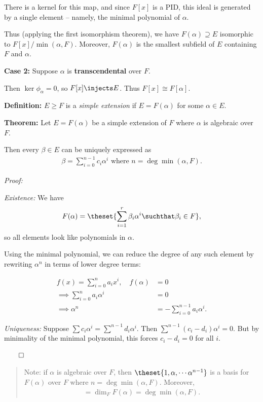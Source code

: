 There is a kernel for this map, and since \(F[x]\) is a PID, this ideal
is generated by a single element -- namely, the minimal polynomial of
\(\alpha\).

Thus (applying the first isomorphism theorem), we have
\(F(\alpha) \supseteq E\) isomorphic to \(F[x] / \min(\alpha, F)\).
Moreover, \(F(\alpha)\) is the smallest subfield of \(E\) containing
\(F\) and \(\alpha\).

\textbf{Case 2:} Suppose \(\alpha\) is \textbf{transcendental} over
\(F\).

Then \(\ker \phi_\alpha = 0\), so \(F[x] \injects E\). Thus
\(F[x] \cong F[\alpha]\).

\textbf{Definition:} \(E \geq F\) is a \emph{simple extension} if
\(E = F(\alpha)\) for some \(\alpha \in E\).

\textbf{Theorem:} Let \(E = F(\alpha)\) be a simple extension of \(F\)
where \(\alpha\) is algebraic over \(F\).

Then every \(\beta \in E\) can be uniquely expressed as
\begin{align*}
\beta = \sum_{i=0}^{n-1} c_i \alpha^i \text{ where } n = \deg \min(\alpha, F)
.\end{align*}

\emph{Proof:}

\emph{Existence:} We have
\begin{align*}
F(\alpha) = \theset{\sum_{i=1}^r \beta_i \alpha^i \suchthat \beta_i \in F}
,\end{align*} so all elements look like polynomials in \(\alpha\).

Using the minimal polynomial, we can reduce the degree of any such
element by rewriting \(\alpha^n\) in terms of lower degree terms:

\begin{align*}
f(x) = \sum_{i=0}^n a_i x^i, \quad f(\alpha) &= 0 \\
\implies \sum_{i=0}^n a_i \alpha^i &= 0 \\
\implies \alpha^n &= -\sum_{i=0}^{n-1} a_i \alpha^i
.\end{align*}

\emph{Uniqueness:} Suppose
\(\sum c_i \alpha^i = \sum^{n-1} d_i \alpha^i\). Then
\(\sum^{n-1} (c_i - d_i) \alpha^i = 0\). But by minimality of the
minimal polynomial, this forces \(c_i - d_i = 0\) for all \(i\).

\(\qed\)

\begin{quote}
Note: if \(\alpha\) is algebraic over \(F\), then
\(\theset{1, \alpha, \cdots \alpha^{n-1}}\) is a basis for \(F(\alpha)\)
over \(F\) where \(n = \deg \min(\alpha, F)\). Moreover,
\begin{align*}
[F(\alpha):F] = \dim_F F(\alpha) = \deg\min(\alpha, F)
.\end{align*}
\end{quote}

